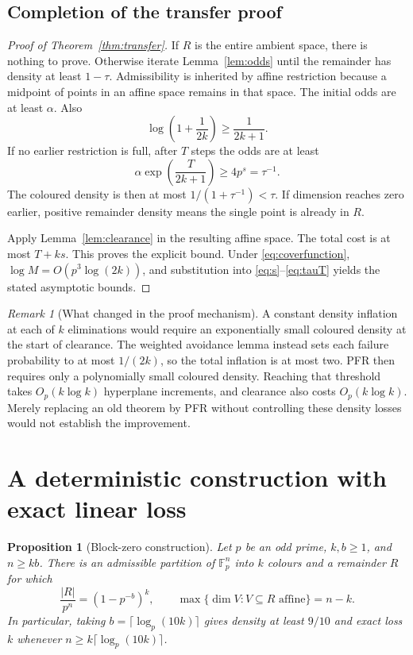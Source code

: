 \documentclass[11pt]{article}
\newtheorem{proposition}[theorem]{Proposition}
\theoremstyle{remark}
\newtheorem{remark}[theorem]{Remark}
\newcommand{\Fp}{\mathbb F_p}
\begin{document}
\subsection{Completion of the transfer proof}

\begin{proof}[Proof of Theorem~\ref{thm:transfer}]
If $R$ is the entire ambient space, there is nothing to prove. Otherwise
iterate Lemma~\ref{lem:odds} until the remainder has density at least
$1-\tau$. Admissibility is inherited by affine restriction because a
midpoint of points in an affine space remains in that space.
The initial odds are at least $\alpha$. Also
\[
 \log\left(1+\frac1{2k}\right)\geq\frac1{2k+1}.
\]
If no earlier restriction is full, after $T$ steps the odds are at least
\[
 \alpha\exp\left(\frac{T}{2k+1}\right)\geq4p^s=\tau^{-1}.
\]
The coloured density is then at most $1/(1+\tau^{-1})<\tau$.
If dimension reaches zero earlier, positive remainder density means the
single point is already in $R$.

Apply Lemma~\ref{lem:clearance} in the resulting affine space. The total
cost is at most $T+ks$. This proves the explicit bound. Under
\eqref{eq:coverfunction}, $\log M=O(p^3\log(2k))$, and substitution into
\eqref{eq:s}--\eqref{eq:tauT} yields the stated asymptotic bounds.
\end{proof}

\begin{remark}[What changed in the proof mechanism]
A constant density inflation at each of $k$ eliminations would require an
exponentially small coloured density at the start of clearance. The
weighted avoidance lemma instead sets each failure probability to at most
$1/(2k)$, so the total inflation is at most two. PFR then requires only a
polynomially small coloured density. Reaching that threshold takes
$O_p(k\log k)$ hyperplane increments, and clearance also costs
$O_p(k\log k)$. Merely replacing an old theorem by PFR without controlling
these density losses would not establish the improvement.
\end{remark}

\section{A deterministic construction with exact linear loss}

\begin{proposition}[Block-zero construction]\label{prop:block}
Let $p$ be an odd prime, $k,b\geq1$, and $n\geq kb$. There is an admissible
partition of $\Fp^n$ into $k$ colours and a remainder $R$ for which
\[
 \frac{|R|}{p^n}=(1-p^{-b})^k,
 \qquad
 \max\{\dim V:V\subseteq R\text{ affine}\}=n-k.
\]
In particular, taking $b=\lceil\log_p(10k)\rceil$ gives density at least
$9/10$ and exact loss $k$ whenever $n\geq k\lceil\log_p(10k)\rceil$.
\end{proposition}
\end{document}
